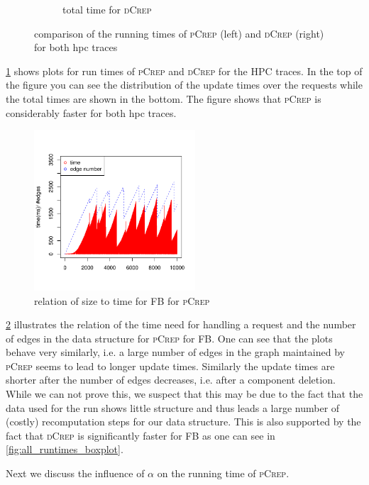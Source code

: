 \documentclass[a4paper,UKenglish,cleveref, autoref, thm-restate,authorcolumns]{lipics-v2019}
\newcommand{\adjDel}{\textsc{pCrep}}
\newcommand{\directDecomp}{\textsc{dCrep}}
\newcommand{\fb}{FB}
\begin{document}
\begin{figure}
\begin{minipage}{0.48\linewidth}
\begin{subfigure}[b]{\linewidth}
			\caption{total time for \directDecomp}
		\end{subfigure}		
	\end{minipage}
	\caption{comparison of the running times of \adjDel{} (left) and \directDecomp{} (right) for both hpc traces}\label{fig:hpc_runtimes_boxplot_restricted}
\end{figure}

\cref{fig:hpc_runtimes_boxplot_restricted} shows plots for run times of \adjDel{} 
and \directDecomp{} for the HPC traces. In the top of the figure you can see the 
distribution of the update times over the requests while the total times are shown 
in the bottom. The figure shows that \adjDel{} is considerably faster for both hpc traces.

\begin{figure}
	\centering
	\includegraphics*[height=6cm]{"plots/plot_facebook_time_to_size"}
	\caption{relation of size to time for \fb{} for \adjDel{}}\label{fig:fb_size_to_time}
\end{figure}

\cref{fig:fb_size_to_time} illustrates the relation of the time need for handling a 
request and the number of edges in the data structure for \adjDel{} for \fb{}. One can see that
the plots behave very similarly, i.e. a large number of edges in the graph maintained by 
\adjDel{} seems to lead to longer update times. Similarly the update times are shorter after 
the number of edges decreases, i.e. after a component deletion. While we can not prove this, 
we suspect that this may 
be due to the fact that the data used for the run shows little structure and thus leads
a large number of (costly) recomputation steps for our data structure. This is also supported 
by the fact that \directDecomp{} is significantly faster for \fb{} as one can see in 
\cref{fig:all_runtimes_boxplot}.

Next we discuss the influence of $\alpha$ on the running time of \adjDel{}.
\end{document}
